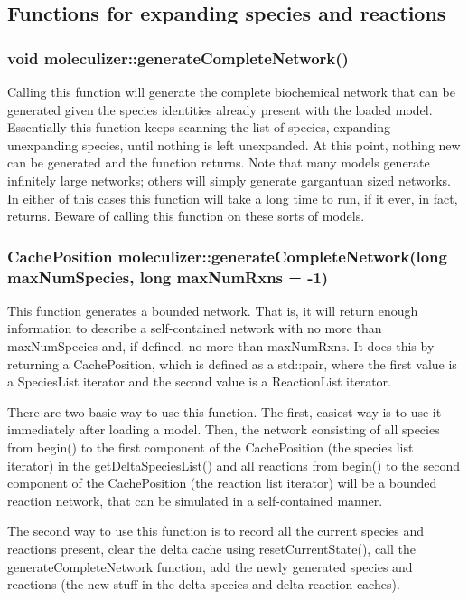 \subsection{Functions for expanding species and reactions}

\subsubsection{void moleculizer::generateCompleteNetwork()}
Calling this function will generate the complete biochemical network
that can be generated given the species identities already present
with the loaded model.  Essentially this function keeps scanning the
list of species, expanding unexpanding species, until nothing is left
unexpanded.  At this point, nothing new can be generated and the
function returns.  Note that many models generate infinitely large
networks; others will simply generate gargantuan sized networks.  In
either of this cases this function will take a long time to run, if it
ever, in fact, returns.  Beware of calling this function on these
sorts of models.

\subsubsection{CachePosition moleculizer::generateCompleteNetwork(long maxNumSpecies, long
maxNumRxns = -1)}

This function generates a bounded network.  That is,
it will return enough information to describe a self-contained network
with no more than maxNumSpecies and, if defined, no more than
maxNumRxns.  It does this by returning a CachePosition, which is
defined as a std::pair, where the first value is a SpeciesList
iterator and the second value is a ReactionList iterator.  

There are two basic way to use this function.  The first, easiest way
is to use it immediately after loading a model.  Then, the network
consisting of all species from begin() to the first component of the
CachePosition (the species list iterator) in the
getDeltaSpeciesList() and all reactions from begin() to the second
component of the CachePosition (the reaction list iterator) will be a
bounded reaction network, that can be simulated in a self-contained
manner.

The second way to use this function is to record all the current
species and reactions present, clear the delta cache using
resetCurrentState(), call the generateCompleteNetwork function, add
the newly generated species and reactions (the new stuff in the delta
species and delta reaction caches).  




